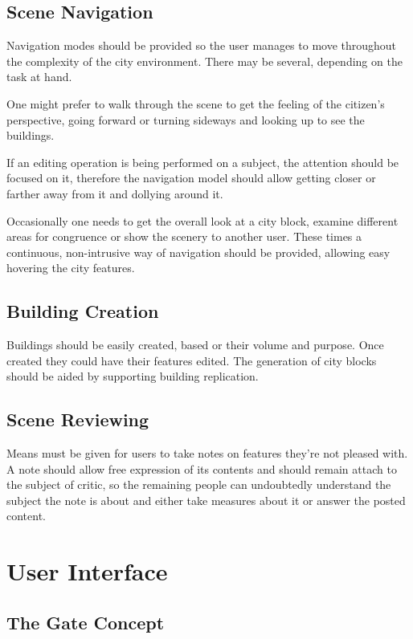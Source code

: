 \subsection{Scene Navigation}

Navigation modes should be provided so the user manages
to move throughout the complexity of the city environment.
There may be several, depending on the task at hand.

One might prefer to walk through the scene to get the feeling of the citizen's perspective,
going forward or turning sideways and looking up to see the buildings.

If an editing operation is being performed on a subject, the attention should be focused on it,
therefore the navigation model should allow getting closer or farther away from it and dollying around it.

Occasionally one needs to get the overall look at a city block, examine different areas for congruence
or show the scenery to another user. These times a continuous, non-intrusive way of navigation should be provided,
allowing easy hovering the city features.


\subsection{Building Creation}

Buildings should be easily created, based or their volume and purpose.
Once created they could have their features edited.
The generation of city blocks should be aided by supporting building replication.


\subsection{Scene Reviewing}

Means must be given for users to take notes on features they're not pleased with.
A note should allow free expression of its contents and should remain attach to the
subject of critic, so the remaining people can undoubtedly understand the subject
the note is about and either take measures about it or answer the posted content.




\section{User Interface}

\subsection{The Gate Concept}
\label{sec:gate-concept}


